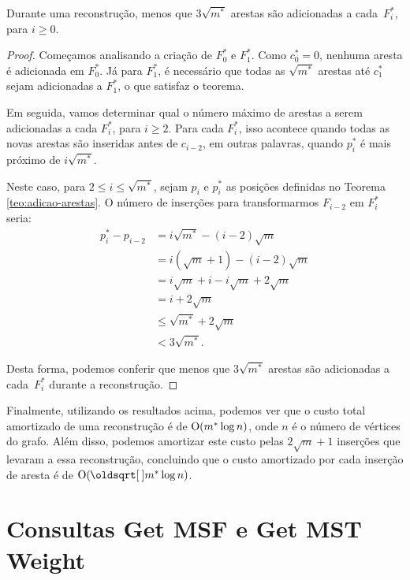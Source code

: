\begin{theorem}
    \label{teo:deslocamento}
    Durante uma reconstrução, menos que $3 \sqrt{m^*}$ arestas são adicionadas a cada~$F_i^*$, para $i \geq 0$.
\end{theorem}
\begin{proof}
    Começamos analisando a criação de $F_0^*$ e $F_1^*$. Como $c_0^* = 0$, nenhuma aresta é adicionada em $F_0^*$. Já para $F_1^*$, é necessário que todas as $\sqrt{m^*}$ arestas até $c_1^*$ sejam adicionadas a $F_1^*$, o que satisfaz o teorema.

    Em seguida, vamos determinar qual o número máximo de arestas a serem adicionadas a cada $F_i^*$, para $i \geq 2$. Para cada $F_i^*$, isso acontece quando todas as novas arestas são inseridas antes de $c_{i-2}$, em outras palavras, quando $p_i^*$ é mais próximo de $i \sqrt{m^*}$.

    Neste caso, para $2 \leq i \leq \sqrt{m^*}$, sejam $p_i$ e $p_i^*$ as posições definidas no Teorema \ref{teo:adicao-arestas}. O número de inserções para transformarmos $F_{i-2}$ em $F_i^*$ seria:
    \begin{align*}
        p_i^* - p_{i-2} & = i\sqrt{m^*} - (i-2)\sqrt{m}           \\
                        & = i(\sqrt{m}+1) - (i-2)\sqrt{m}         \\
                        & = i\sqrt{m} + i - i\sqrt{m} + 2\sqrt{m} \\
                        & = i + 2\sqrt{m}                         \\
                        & \leq \sqrt{m^*} + 2\sqrt{m}             \\
                        & < 3\sqrt{m^*}.
    \end{align*}

    Desta forma, podemos conferir que menos que $3 \sqrt{m^*}$ arestas são adicionadas a cada~$F_i^*$ durante a reconstrução.
\end{proof}

Finalmente, utilizando os resultados acima, podemos ver que o custo total amortizado de uma reconstrução é de $\mathrm{O}(m^* \log{n})$, onde $n$ é o número de vértices do grafo. Além disso, podemos amortizar este custo pelas $2\sqrt{m} + 1$ inserções que levaram a essa reconstrução, concluindo que o custo amortizado por cada inserção de aresta é de $\Oh(\sqrt{m^*} \log{n})$.

\section{Consultas Get MSF e Get MST Weight}
\label{sec:rmsf-get-msf}

